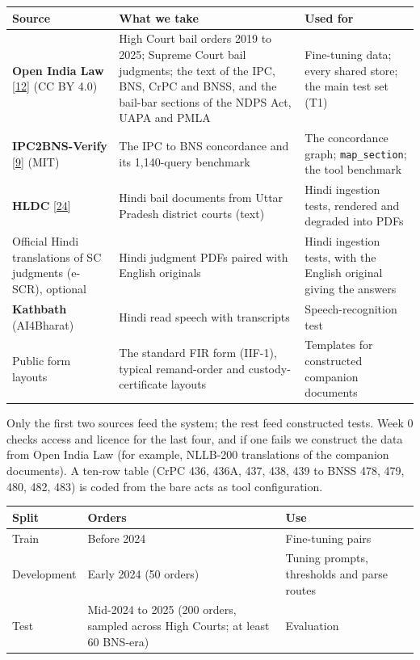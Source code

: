 \documentclass[10pt,a4paper]{article}
\newcommand{\st}[1]{\texttt{\small #1}}
\begin{document}
{\small
\begin{xltabular}{\linewidth}{@{}>{\raggedright\arraybackslash{}\hsize}X>{\raggedright\arraybackslash{}\hsize}X>{\raggedright\arraybackslash{}\hsize}X@{}}
\toprule
\textbf{Source} & \textbf{What we take} & \textbf{Used for} \\
\midrule
\endhead
\textbf{Open India Law} [\href{https://huggingface.co/datasets/vaquill/open-india-law}{12}] (CC BY 4.0) & High Court bail orders 2019 to 2025; Supreme Court bail judgments; the text of the IPC, BNS, CrPC and BNSS, and the bail-bar sections of the NDPS Act, UAPA and PMLA & Fine-tuning data; every shared store; the main test set (T1) \\
\textbf{IPC2BNS-Verify} [\href{https://github.com/MS-406/IPC2BNS-Verify}{9}] (MIT) & The IPC to BNS concordance and its 1,140-query benchmark & The concordance graph; \st{map\_\allowbreak{}section}; the tool benchmark \\
\textbf{HLDC} [\href{https://arxiv.org/abs/2204.00806}{24}] & Hindi bail documents from Uttar Pradesh district courts (text) & Hindi ingestion tests, rendered and degraded into PDFs \\
Official Hindi translations of SC judgments (e-SCR), optional & Hindi judgment PDFs paired with English originals & Hindi ingestion tests, with the English original giving the answers \\
\textbf{Kathbath} (AI4Bharat) & Hindi read speech with transcripts & Speech-recognition test \\
Public form layouts & The standard FIR form (IIF-1), typical remand-order and custody-certificate layouts & Templates for constructed companion documents \\
\bottomrule
\end{xltabular}}

Only the first two sources feed the system; the rest feed constructed tests. Week 0 checks access and licence for the last four, and if one fails we construct the data from Open India Law (for example, NLLB-200 translations of the companion documents). A ten-row table (CrPC 436, 436A, 437, 438, 439 to BNSS 478, 479, 480, 482, 483) is coded from the bare acts as tool configuration.

{\small
\begin{xltabular}{\linewidth}{@{}>{\raggedright\arraybackslash{}\hsize}X>{\raggedright\arraybackslash{}\hsize}X>{\raggedright\arraybackslash{}\hsize}X@{}}
\toprule
\textbf{Split} & \textbf{Orders} & \textbf{Use} \\
\midrule
\endhead
Train & Before 2024 & Fine-tuning pairs \\
Development & Early 2024 (50 orders) & Tuning prompts, thresholds and parse routes \\
Test & Mid-2024 to 2025 (200 orders, sampled across High Courts; at least 60 BNS-era) & Evaluation \\
\bottomrule
\end{xltabular}}
\end{document}
